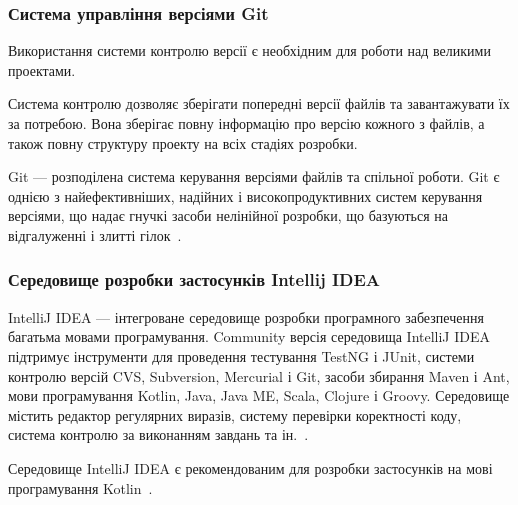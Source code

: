 \subsubsection{Система управління версіями Git}
Використання системи контролю версії є необхідним для роботи над великими проектами.

Система контролю дозволяє зберігати попередні версії файлів та завантажувати їх за потребою. 
Вона зберігає повну інформацію про версію кожного з файлів, а також повну структуру проекту на всіх стадіях розробки.

Git --- розподілена система керування версіями файлів та спільної роботи. Git є однією з найефективніших, надійних і високопродуктивних систем керування версіями, що надає гнучкі засоби нелінійної розробки, що базуються на відгалуженні і злитті гілок~\cite{Chacon2009}.

\subsubsection{Середовище розробки застосунків Intellij IDEA}
IntelliJ IDEA --- інтегроване середовище розробки програмного забезпечення багатьма мовами програмування. 
Community версія середовища IntelliJ IDEA підтримує інструменти для проведення тестування TestNG і JUnit, системи контролю версій CVS, Subversion, Mercurial і Git, засоби збирання Maven і Ant, мови програмування Kotlin, Java, Java ME, Scala, Clojure і Groovy. 
Середовище містить редактор регулярних виразів, систему перевірки коректності коду, система контролю за виконанням завдань та ін.~\cite{Kalinichenko2013}.

Середовище IntelliJ IDEA є рекомендованим для розробки застосунків на мові програмування Kotlin~\cite{kotlin}.

